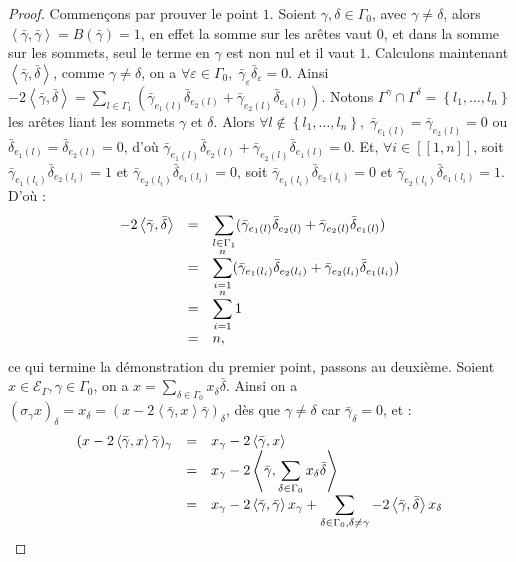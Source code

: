 \documentclass[a4paper,10pt]{article}
\newcommand{\ps}[2]{\left\langle#1,#2\right\rangle}
\newcommand{\EG}{\mathscr{E}_\Gamma}
\newcommand{\ent}[2]{[\![#1,#2]\!]}
\newcommand{\dps}{\displaystyle}
\begin{document}
		\begin{proof}
			Commençons par prouver le point $1$. Soient $\gamma,\delta\in\Gamma_0$, avec $\gamma\neq\delta$, alors $\ps{\bar\gamma}{\bar\gamma}=B(\bar\gamma)=1$, en effet la somme sur les arêtes vaut 0, et dans la somme sur les sommets, seul le terme en $\gamma$ est non nul et il vaut $1$. Calculons maintenant $\ps{\bar\gamma}{\bar\delta}$, comme $\gamma\neq\delta$, on a $\forall\varepsilon\in\Gamma_0,\;\bar\gamma_\varepsilon\bar\delta_\varepsilon=0$. Ainsi $-2\ps{\bar\gamma}{\bar\delta}=\sum_{l\in\Gamma_1}(\bar\gamma_{e_1(l)}\bar\delta_{e_2(l)}+\bar\gamma_{e_2(l)}\bar\delta_{e_1(l)})$. Notons $\Gamma^\gamma\cap\Gamma^\delta=\left\{ l_1,\dots,l_n \right\}$ les arêtes liant les sommets $\gamma$ et $\delta$. Alors $\forall l\notin\left\{ l_1,\dots,l_n \right\},\;\bar\gamma_{e_1(l)}=\bar\gamma_{e_2(l)}=0$ ou $\bar\delta_{e_1(l)}=\bar\delta_{e_2(l)}=0$, d'où $\bar\gamma_{e_1(l)}\bar\delta_{e_2(l)}+\bar\gamma_{e_2(l)}\bar\delta_{e_1(l)}=0$. Et, $\forall i \in\ent{1}{n}$, soit $\bar\gamma_{e_1(l_i)}\bar\delta_{e_2(l_i)}=1$ et $\bar\gamma_{e_2(l_i)}\bar\delta_{e_1(l_i)}=0$, soit $\bar\gamma_{e_1(l_i)}\bar\delta_{e_2(l_i)}=0$ et $\bar\gamma_{e_2(l_i)}\bar\delta_{e_1(l_i)}=1$. D'où :
			\[
		\begin{array}{>{\dps}r>{\dps}l>{\dps}l}
			-2\ps{\bar\gamma}{\bar\delta}&=& \sum_{l\in\Gamma_1}(\bar\gamma_{e_1(l)}\bar\delta_{e_2(l)}+\bar\gamma_{e_2(l)}\bar\delta_{e_1(l)})\\
			&=& \sum_{i=1}^n(\bar\gamma_{e_1(l_i)}\bar\delta_{e_2(l_i)}+\bar\gamma_{e_2(l_i)}\bar\delta_{e_1(l_i)})\\
			&=& \sum_{i=1}^n 1\\
			&=& n,
		\end{array}
			\]
			ce qui termine la démonstration du premier point, passons au deuxième. Soient $x\in\EG,\gamma\in\Gamma_0$, on a $x=\sum_{\delta\in\Gamma_0}x_\delta\bar\delta$. Ainsi on a $(\sigma_\gamma x)_\delta=x_\delta=(x-2\ps{\bar\gamma}{x}\bar\gamma)_\delta$, dès que $\gamma\neq\delta$ car $\bar\gamma_\delta=0$, et :
			\[
		\begin{array}{>{\dps}r>{\dps}l>{\dps}l}
			(x-2\ps{\bar\gamma}{x}\bar\gamma)_{\gamma}&=& x_\gamma-2\ps{\bar\gamma}{x}\\
			&=& x_\gamma-2\ps{\bar\gamma}{\sum_{\delta\in\Gamma_0}x_\delta\bar\delta}\\
			&=& x_\gamma-2\ps{\bar\gamma}{\bar\gamma}x_\gamma+\sum_{\delta\in\Gamma_0,\delta\neq\gamma}-2\ps{\bar\gamma}{\bar\delta}x_\delta\\

\end{array}\]
\end{proof}
\end{document}
